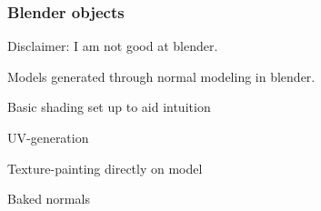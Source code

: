 \documentclass[12pt]{beamer}
\begin{document}
    \begin{frame}
        \frametitle{Blender objects}

        Disclaimer: I am not good at blender.

        Models generated through normal modeling in blender.

        Basic shading set up to aid intuition

        UV-generation

        Texture-painting directly on model

        Baked normals


    \end{frame}
%
%
%
%
%
%
%
%
%
%
%
\end{document}
